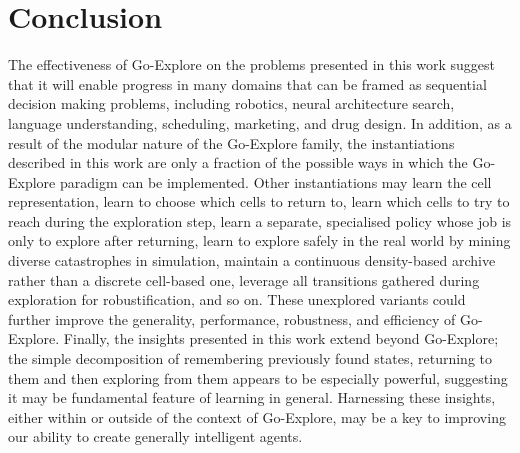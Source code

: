 \documentclass{nature}
\renewcommand*{\cite}[1]{\supercite{#1}}
\begin{document}
\section*{Conclusion}
\label{sec:conclusion}

The effectiveness of Go-Explore on the problems presented in this work suggest that it will enable progress in many domains that can be framed as sequential decision making problems, including robotics\cite{cully2015robots,andrychowicz2020learning,peng2018sim,tan2018sim}, neural architecture search\cite{liu2018darts}, language understanding\cite{madotto2020exploration}, scheduling\cite{zhang1995reinforcement}, marketing\cite{abe2004cross}, and drug design\cite{popova2018deep}.
In addition, as a result of the modular nature of the Go-Explore family, the instantiations described in this work are 
only a fraction of the possible ways in which the Go-Explore paradigm can be implemented.
Other instantiations may learn the cell representation, learn to choose which cells to return to, learn which cells to try to reach during the exploration step, learn a separate, specialised policy whose job is only to explore after returning, learn to explore safely in the real world by mining diverse catastrophes in simulation, maintain a continuous density-based archive rather than a discrete cell-based one,
leverage all transitions gathered during exploration for robustification,
and so on.
These unexplored variants could further improve the generality, performance, robustness, and efficiency of Go-Explore.
Finally, the insights presented in this work extend beyond Go-Explore; the simple decomposition of remembering previously found states, returning to them and then exploring from them appears to be especially powerful, suggesting it may be fundamental feature of learning in general.
Harnessing these insights, either within or outside of the context of Go-Explore, may be a key to improving our ability to create generally intelligent agents.

\printbibliography[segment=1,check=onlynew]
\endrefsegment
\newrefsegment








\clearpage
\end{document}
